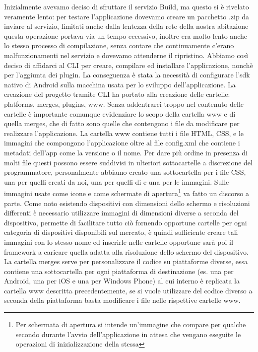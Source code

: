 			Inizialmente avevamo deciso di sfruttare il servizio \pg{}Build, 
			ma questo si è rivelato veramente lento: per testare l'applicazione 
			dovevamo creare un pacchetto .zip da inviare al servizio, limitati 
			anche dalla lentezza della rete della nostra abitazione questa operazione 
			portava via un tempo eccessivo, inoltre era molto lento anche 
			lo stesso processo di compilazione, senza contare che continuamente 
			c'erano malfunzionamenti nel servizio e dovevamo attenderne il ripristino. 
			Abbiamo così deciso di affidarci al CLI per creare, compilare ed 
			installare l'applicazione, nonchè per l'aggiunta dei plugin. La 
			conseguenza è stata la necessità di configurare l'sdk nativo di Android
			sulla macchina usata per lo sviluppo dell'applicazione.
			La creazione del progetto tramite CLI ha portato alla creazione 
			delle cartelle: platforms, merges, plugins, www.
			Senza addentrarci troppo nel contenuto delle cartelle è importante 
			comunque evidenziare lo scopo della cartella www e di quella merges, 
			che di fatto sono quelle che contengono i file da modificare per 
			realizzare l'applicazione.
			La cartella www contiene tutti i file HTML, CSS, \js{} e le immagini
			che compongono l'applicazione oltre al file config.xml che contiene 
			i metadati dell'app come la versione o il nome. 
			Per dare più ordine in presenza di molti 
			file questi possono essere suddivisi in ulteriori sottocartelle a 
			discrezione del programmatore, personalmente abbiamo creato una sottocartella 
			per i file CSS, 
			una per quelli \js{} creati da noi, una per quelli \js{} di \kendomob{} e 
			una per le immagini.
			Sulle immagini usate come icone e come schermate di apertura\footnote{
			Per schermata di apertura si intende un'immagine che compare per qualche 
			secondo durante l'avvio dell'applicazione in attesa che vengano eseguite 
			le operazioni di inizializzazione della stessa} va fatto 
			un discorso a parte. Come noto esistendo 
			dispositivi con dimensioni dello schermo e risoluzioni differenti 
			è necessario utilizzare immagini di dimensioni diverse a seconda 
			del dispositivo, \pg{} permette di facilitare tutto ciò fornendo 
			opportune cartelle per ogni categoria di dispositivi disponibili sul 
			mercato, è quindi sufficiente creare tali immagini con lo stesso nome 
			ed inserirle nelle cartelle opportune sarà poi il framework a caricare 
			quella adatta alla risoluzione dello schermo del dispositivo.
			La cartella merges serve per personalizzare il codice su piattaforme 
			diverse, essa contiene una sottocartella per ogni piattaforma di destinazione
			(es. una per Android, una per iOS e una per Windows Phone) 
			al cui interno è replicata la cartella www descritta precedentemente,
			se si vuole utilizzare del codice diverso a seconda della piattaforma 
			basta modificare i file nelle rispettive cartelle www.
			
